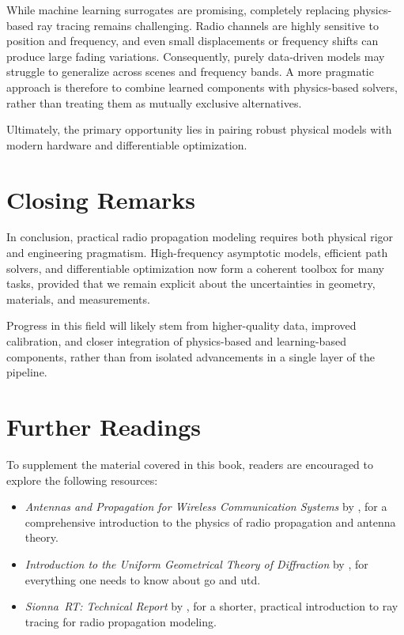 While machine learning surrogates are promising, completely replacing physics-based ray tracing remains challenging. Radio channels are highly sensitive to position and frequency, and even small displacements or frequency shifts can produce large fading variations. Consequently, purely data-driven models may struggle to generalize across scenes and frequency bands. A more pragmatic approach is therefore to combine learned components with physics-based solvers, rather than treating them as mutually exclusive alternatives.

Ultimately, the primary opportunity lies in pairing robust physical models with modern hardware and differentiable optimization.

\section{Closing Remarks}

In conclusion, practical radio propagation modeling requires both physical rigor and engineering pragmatism. High-frequency asymptotic models, efficient path solvers, and differentiable optimization now form a coherent toolbox for many tasks, provided that we remain explicit about the uncertainties in geometry, materials, and measurements.

Progress in this field will likely stem from higher-quality data, improved calibration, and closer integration of physics-based and learning-based components, rather than from isolated advancements in a single layer of the pipeline.

\section*{Further Readings}

To supplement the material covered in this book, readers are encouraged to explore the following resources:
\begin{itemize}
  \item \emph{Antennas and Propagation for Wireless Communication Systems} by \textcite{Saunders2024}, for a comprehensive introduction to the physics of radio propagation and antenna theory.
  \item \emph{Introduction to the Uniform Geometrical Theory of Diffraction} by \textcite{McNamara1990}, for everything one needs to know about \gls{go} and \gls{utd}.
  \item \emph{Sionna~RT: Technical Report} by \textcite{Aoudia2025}, for a shorter, practical introduction to ray tracing for radio propagation modeling.
\end{itemize}
